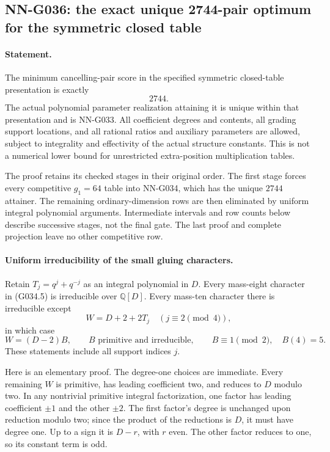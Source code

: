 \subsection{NN-G036: the exact unique 2744-pair optimum for the symmetric closed table}
\paragraph{Statement.}
The minimum cancelling-pair score in the specified symmetric
closed-table presentation is exactly
\[
                                2744.                \tag{G036.1}
\]
The actual polynomial parameter realization attaining it is
unique within that presentation and is NN-G033.
All coefficient degrees and contents, all grading support
locations, and all rational ratios and auxiliary parameters
are allowed, subject to integrality and effectivity of the
actual structure constants. This is not a numerical lower
bound for unrestricted extra-position multiplication tables.

The proof retains its checked stages in their original order.
The first stage forces every competitive $g_1=64$ table into
NN-G034, which has the unique $2744$ attainer. The remaining
ordinary-dimension rows are then eliminated by uniform
integral polynomial arguments. Intermediate intervals and
row counts below describe successive stages, not the final
gate. The last proof and complete projection leave no other
competitive row.

\paragraph{Uniform irreducibility of the small gluing characters.}
Retain $T_j=q^j+q^{-j}$ as an integral polynomial in $D$.
Every mass-eight character in (G034.5) is irreducible
over $\mathbb Q[D]$.
Every mass-ten character there is irreducible except
\[
 W=D+2+2T_j\quad(j\equiv2\pmod4),
\]
in which case
\[
               W=(D-2)B,\qquad B\text{ primitive and irreducible},
               \qquad B\equiv1\pmod2,\quad B(4)=5.   \tag{G036.2}
\]
These statements include all support indices $j$.

Here is an elementary proof. The degree-one choices
are immediate. Every remaining $W$ is primitive,
has leading coefficient two, and reduces to $D$
modulo two. In any nontrivial primitive integral
factorization, one factor has leading coefficient
$\pm1$ and the other $\pm2$. The first factor's
degree is unchanged upon reduction modulo two;
since the product of the reductions is $D$, it
must have degree one. Up to a sign it is $D-r$,
with $r$ even. The other factor reduces to one,
so its constant term is odd.

